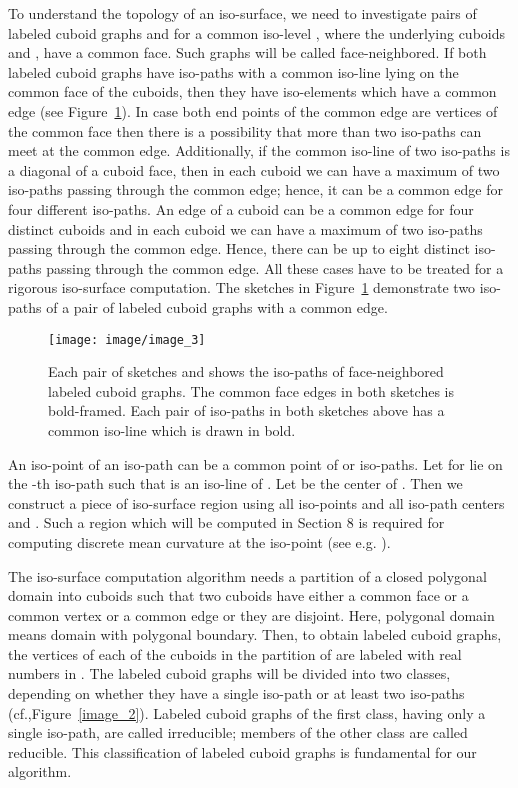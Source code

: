 \documentclass[a4paper,11pt]{article}
\begin{document}
To understand the topology of an iso-surface, we need to investigate pairs of labeled cuboid graphs
 and  for a common iso-level ,
where the underlying cuboids  and , have a common face. Such graphs will be called
face-neighbored. If both labeled cuboid graphs have iso-paths with a common iso-line lying on the
common face of the cuboids, then they have iso-elements which have a common edge
(see Figure~\ref{image_3}). In case both end points of the common edge
are vertices of the common face then there is a possibility that more than two iso-paths can meet at
the common edge. Additionally, if the common iso-line of two iso-paths is a diagonal of a cuboid face,
then in each cuboid we can have a maximum of two iso-paths passing through the common edge; hence, it
can be a common edge for four different iso-paths. An edge of a cuboid can be a common edge for four
distinct cuboids and in each cuboid we can have a maximum of two iso-paths passing
through the common edge. Hence, there can be up to eight distinct iso-paths passing through the common edge.
All these cases have to be treated for a rigorous iso-surface computation. The sketches in Figure~\ref{image_3}
demonstrate two iso-paths of a pair of labeled cuboid graphs with a common edge.
\begin{figure}[!ht]
\texttt{[image: image/image\_3]}
\caption{Each pair of sketches  and  shows the iso-paths of
face-neighbored labeled cuboid graphs. The common face edges in both sketches is bold-framed.
Each pair of iso-paths in both sketches above has a common iso-line which is drawn in bold.}
\label{image_3}
\end{figure}
\FloatBarrier

An iso-point  of an iso-path can be a common point of  or  iso-paths.
Let  for  lie on the -th iso-path  such that  is
an iso-line of . Let  be the center of . Then we construct a
piece of iso-surface region  using all iso-points  and all iso-path centers
 and . Such a region which will be computed in Section 8 is required for computing
discrete mean curvature at the iso-point  (see e.g. \cite{Meyer02Vismath}).

The iso-surface computation algorithm needs a partition  of a closed polygonal domain
 into cuboids such that two cuboids have either a common face or
a common vertex or a common edge or they are disjoint. Here, polygonal domain means domain with
polygonal boundary. Then, to obtain labeled cuboid graphs, the vertices of each of the cuboids in
the partition  of  are labeled with real numbers in . The labeled
cuboid graphs will be divided into two classes, depending on whether they have a single iso-path
or at least two iso-paths (cf.,Figure~\ref{image_2}).
Labeled cuboid graphs of the first class, having only a single iso-path, are called irreducible;
members of the other class are called reducible. This classification of labeled cuboid graphs is
fundamental for our algorithm.
\end{document}
